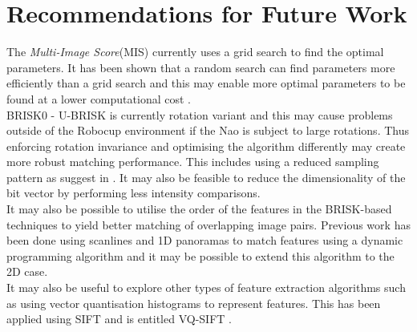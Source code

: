




\section{Recommendations for Future Work}
\label{sec:recommend}
The \textit{Multi-Image Score}(MIS) currently uses a grid search to find the optimal parameters. It has been shown that a random search can find parameters more efficiently than a grid search and this may enable more optimal parameters to be found at a lower computational cost \citep{Bergstra2012}.\\

BRISK0 - U-BRISK is currently rotation variant and this may cause problems outside of the Robocup environment if the Nao is subject to large rotations. Thus enforcing rotation invariance and optimising the algorithm differently may create more robust matching performance. This includes using a reduced sampling pattern as suggest in \citep{Leutenegger2011}. It may also be feasible to reduce the dimensionality of the bit vector by performing less intensity comparisons. \\

It may also be possible to utilise the order of the features in the BRISK-based techniques to yield better matching of overlapping image pairs. Previous work has been done using scanlines and 1D panoramas to match features using a dynamic programming algorithm \citep{Birchfield1998, Way1996, Briggs} and it may be possible to extend this algorithm to the 2D case.\\

It may also be useful to explore other types of feature extraction algorithms such as using vector quantisation histograms to represent features. This has been applied using SIFT and is entitled VQ-SIFT \citep{Chen2011}.\\

